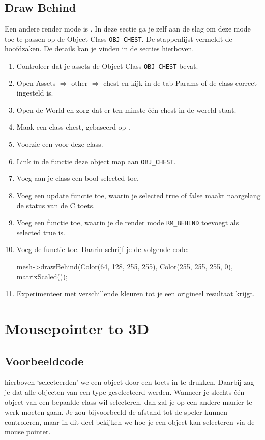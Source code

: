\subsection{Draw Behind}
Een andere render mode is . In deze sectie ga je zelf aan de slag om deze mode toe te passen op de Object Class \texttt{OBJ\_CHEST}. De stappenlijst vermeldt de hoofdzaken. De details kan je vinden in de secties hierboven.

\begin{enumerate}
	\item Controleer dat je assets de Object Class \texttt{OBJ\_CHEST} bevat.
	\item Open Assets $\Rightarrow$ other $\Rightarrow$ chest en kijk in de tab Params of de class correct ingesteld is.
	\item Open de World en zorg dat er ten minste \'e\'en chest in de wereld staat.
	\item Maak een class chest, gebaseerd op .
	\item Voorzie een  voor deze class.
	\item Link in de  functie deze object map aan \texttt{OBJ\_CHEST}.
	\item Voeg aan je class een bool selected toe.
	\item Voeg een update functie toe, waarin je selected true of false maakt naargelang de status van de C toets.
	\item Voeg een functie  toe, waarin je de render mode \texttt{RM\_BEHIND} toevoegt als selected true is.
	\item Voeg de functie  toe. Daarin schrijf je de volgende code:
	
	\begin{code}
		mesh->drawBehind(Color(64, 128, 255, 255), Color(255, 255, 255, 0), matrixScaled()); 
	\end{code}
	
	\item Experimenteer met verschillende kleuren tot je een origineel resultaat krijgt.
\end{enumerate}

\section{Mousepointer to 3D}
\subsection{Voorbeeldcode}
hierboven `selecteerden' we een object door een toets in te drukken. Daarbij zag je dat alle objecten van een type geselecteerd werden. Wanneer je slechts \'e\'en object van een bepaalde class wil selecteren, dan zal je op een andere manier te werk moeten gaan. Je zou bijvoorbeeld de afstand tot de speler kunnen controleren, maar in dit deel bekijken we hoe je een object kan selecteren via de mouse pointer.

